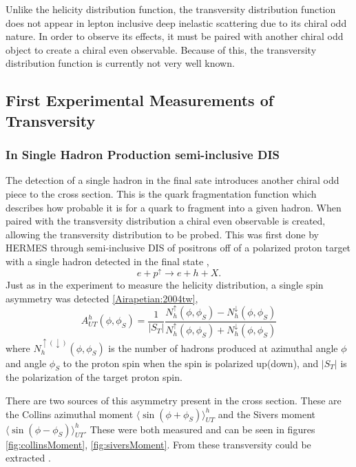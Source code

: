 \documentclass[abstract = on,listof=totoc, bibliography=totoc]{scrreprt}
\begin{document}
Unlike the helicity distribution function, the transversity distribution function does not appear in lepton inclusive deep inelastic scattering due to its chiral odd nature. In order to observe its effects, it must be paired with another chiral odd object to create a chiral even observable. Because of this, the transversity distribution function is currently not very well known. 

\subsection{First Experimental Measurements of Transversity}
\subsubsection{In Single Hadron Production semi-inclusive DIS}
The detection of a single hadron in the final sate introduces another chiral odd piece to the cross section. This is the quark fragmentation function which describes how probable it is for a quark to fragment into a given hadron. When paired with the transversity distribution a chiral even observable is created, allowing the transversity distribution to be probed. This was first done by HERMES through semi-inclusive DIS of positrons off of a polarized proton target with a single hadron detected in the final state \cite{Airapetian:2004tw, Anselmino:2007fs}, 
\begin{equation}
e+p^\uparrow \rightarrow e + h + X.
\end{equation}
Just as in the experiment to measure the helicity distribution, a single spin asymmetry was detected \ref{Airapetian:2004tw},
\begin{equation}
A^h_{UT}(\phi,\phi_S) = \frac{1}{|S_T|}\frac{N^\uparrow_h(\phi,\phi_S) - N^\downarrow_h(\phi,\phi_S)}{N^\uparrow_h(\phi,\phi_S) + N^\downarrow_h(\phi,\phi_S)}
\end{equation} 
where $N^{\uparrow(\downarrow)}_h(\phi,\phi_S)$ is the number of hadrons produced at azimuthal angle $\phi$ and angle $\phi_S$ to the proton spin when the spin is polarized up(down), and $|S_T|$ is the polarization of the target proton spin. 

There are two sources of this asymmetry present in the cross section. These are the Collins azimuthal moment $\langle\sin(\phi+\phi_S)\rangle_{UT}^h$ and the Sivers moment $\langle\sin(\phi-\phi_S)\rangle_{UT}^h$. These were both measured and can be seen in figures \ref{fig:collinsMoment}, \ref{fig:siversMoment}. From these transversity could be extracted \cite{Anselmino:2007fs}.
\end{document}
